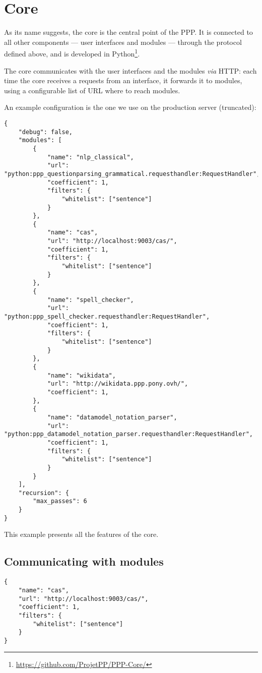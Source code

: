 \section{Core}

As its name suggests, the core is the central point of the PPP. It is
connected to all other components — user interfaces and modules — through
the protocol defined above, and is developed in Python\footnote{\url{https://github.com/ProjetPP/PPP-Core/}}.

The core communicates with the user interfaces and the modules {\em via} HTTP:
each time the core receives a requests from an interface, it forwards it
to modules, using a configurable list of URL where to reach modules.

An example configuration is the one we use on the production server
(truncated):

\begin{verbatim}
{
    "debug": false,
    "modules": [
        {
            "name": "nlp_classical",
            "url": "python:ppp_questionparsing_grammatical.requesthandler:RequestHandler",
            "coefficient": 1,
            "filters": {
                "whitelist": ["sentence"]
            }
        },
        {
            "name": "cas",
            "url": "http://localhost:9003/cas/",
            "coefficient": 1,
            "filters": {
                "whitelist": ["sentence"]
            }
        },
        {
            "name": "spell_checker",
            "url": "python:ppp_spell_checker.requesthandler:RequestHandler",
            "coefficient": 1,
            "filters": {
                "whitelist": ["sentence"]
            }
        },
        {
            "name": "wikidata",
            "url": "http://wikidata.ppp.pony.ovh/",
            "coefficient": 1,
        },
        {
            "name": "datamodel_notation_parser",
            "url": "python:ppp_datamodel_notation_parser.requesthandler:RequestHandler",
            "coefficient": 1,
            "filters": {
                "whitelist": ["sentence"]
            }
        }
    ],
    "recursion": {
        "max_passes": 6
    }
}
\end{verbatim}

This example presents all the features of the core.

\subsection{Communicating with modules}

\begin{verbatim}
{
    "name": "cas",
    "url": "http://localhost:9003/cas/",
    "coefficient": 1,
    "filters": {
        "whitelist": ["sentence"]
    }
}
\end{verbatim}

